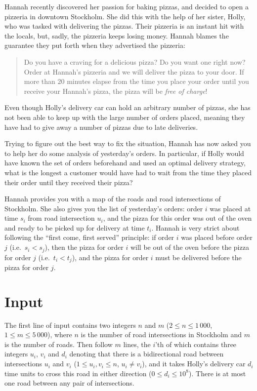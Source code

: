 
%
\noindent
Hannah recently discovered her passion for baking pizzas, and decided to open a
pizzeria in downtown Stockholm. She did this with the help of her sister, Holly,
who was tasked with delivering the pizzas. Their pizzeria is an instant hit
with the locals, but, sadly, the pizzeria keeps losing money. Hannah blames the
guarantee they put forth when they advertised the pizzeria:
\begin{quote}
    Do you have a craving for a delicious pizza? Do you want one right now?
    Order at Hannah's pizzeria and we will deliver the pizza to your door. If
    more than $20$ minutes elapse from the time you place your order until you
    receive your Hannah's pizza, the pizza will be \emph{free of charge}!
\end{quote}
Even though Holly's delivery car can hold an arbitrary number of pizzas, she has
not been able to keep up with the large number of orders placed, meaning they
have had to give away a number of pizzas due to late deliveries.

Trying to figure out the best way to fix the situation, Hannah has now asked you
to help her do some analysis of yesterday's orders. In particular,
if Holly would have known the set of orders beforehand and used an
optimal delivery strategy, what is the longest a customer would have had to
wait from the time they placed their order until they received their pizza?

Hannah provides you with a map of the roads and road intersections of Stockholm.
She also gives you the list of yesterday's orders: order $i$ was placed at time
$s_i$ from road intersection $u_i$, and the pizza for this order was out of the
oven and ready to be picked up for delivery at time $t_i$. Hannah is very strict about following
the ``first come, first served'' principle: if order $i$ was placed before order
$j$ (i.e.\ $s_i < s_j$), then the pizza for order $i$ will be out of the oven
before the pizza for order $j$ (i.e.\ $t_i < t_j$), and the pizza for order $i$
must be delivered before the pizza for order $j$.

\section*{Input}
The first line of input contains two integers $n$ and $m$ ($2 \le n \le 1\,000$, $1 \le m \le 5\,000$), where $n$ is the number of road
intersections in Stockholm and $m$ is the number of roads.
Then follow $m$ lines, the $i$'th of which contains
three integers $u_i$, $v_i$ and $d_i$ denoting that there is a bidirectional road between
intersections $u_i$ and $v_i$ ($1 \le u_i, v_i \le n$, $u_i \neq v_i$), and it takes Holly's
delivery car $d_i$ time units to cross this road in either direction ($0 \le
d_i \le 10^8$). There is at most one road between any pair of intersections.

